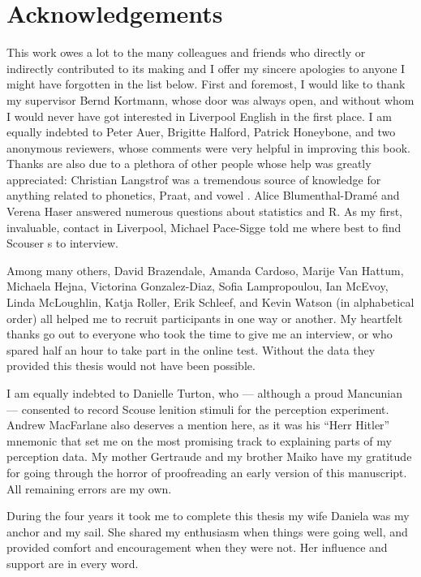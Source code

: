 \chapter*{Acknowledgements}

This work owes a lot to the many colleagues and friends who directly or indirectly contributed to its making and I offer my sincere apologies to anyone I might have forgotten in the list below.
First and foremost, I would like to thank my supervisor Bernd Kortmann, whose door was always open, and without whom I would never have got interested in Liverpool English in the first place.
I am equally indebted to Peter Auer, Brigitte Halford, Patrick Honeybone, and two anonymous reviewers, whose comments were very helpful in improving this book.
Thanks are also due to a plethora of other people whose help was greatly appreciated:
Christian Langstrof was a tremendous source of knowledge for anything related to phonetics, Praat, and vowel .
Alice Blumenthal-Dramé and Verena Haser answered numerous questions about statistics and R.
As my first, invaluable, contact in Liverpool, Michael Pace-Sigge told me where best to find Scouser s to interview.

Among many others, David Brazendale, Amanda Cardoso, Marije Van Hattum, Michaela Hejna, Victorina Gonzalez-Diaz, Sofia Lampropoulou, Ian McEvoy, Linda McLoughlin, Katja Roller, Erik Schleef, and Kevin Watson (in alphabetical order) all helped me to recruit participants in one way or another.
My heartfelt thanks go out to everyone who took the time to give me an interview, or who spared half an hour to take part in the online test.
Without the data they provided this thesis would not have been possible.

I am equally indebted to Danielle Turton, who --- although a proud Mancunian --- consented to record Scouse lenition stimuli for the perception experiment.
Andrew MacFarlane also deserves a mention here, as it was his ``Herr Hitler'' mnemonic that set me on the most promising track to explaining parts of my perception data.
My mother Gertraude and my brother Maiko have my gratitude for going through the horror of proofreading an early version of this manuscript.
All remaining errors are my own.

During the four years it took me to complete this thesis my wife Daniela was my anchor and my sail.
She shared my enthusiasm when things were going well, and provided comfort and encouragement when they were not.
Her influence and support are in every word.
